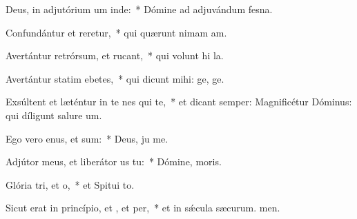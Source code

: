 \item Deus, in adjutórium um inde:~* Dómine ad adjuvándum  fesna.
\item Confundántur et reretur,~* qui quærunt nimam am.
\item Avertántur retrórsum, et rucant,~* qui volunt hi la.
\item Avertántur statim ebetes,~* qui dicunt mihi: ge, ge.
\item Exsúltent et læténtur in te nes qui  te,~* et dicant semper: Magnificétur Dóminus: qui díligunt salure um.
\item Ego vero enus, et  sum:~* Deus, ju me.
\item Adjútor meus, et liberátor us  tu:~* Dómine,  moris.
\item Glória tri, et o,~* et Spitui to.
\item Sicut erat in princípio, et , et per,~* et in sǽcula sæcurum. men.
